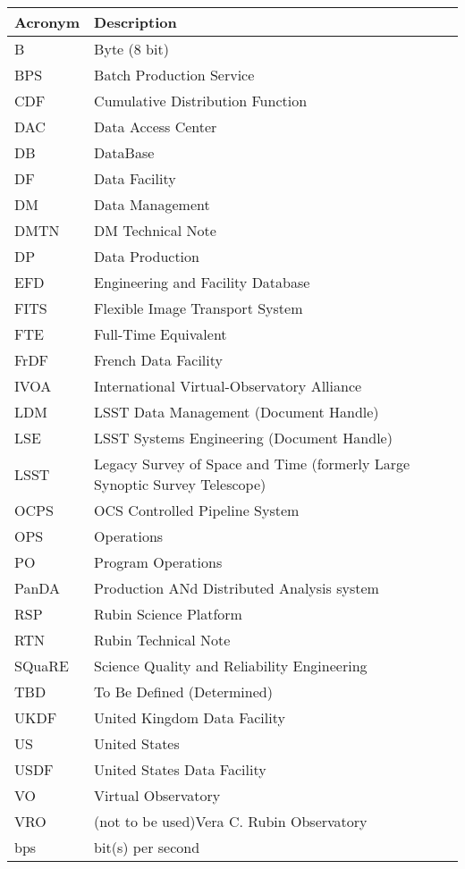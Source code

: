 \addtocounter{table}{-1}
\begin{longtable}{p{}p{}}\hline
\textbf{Acronym} & \textbf{Description}  \\\hline

B & Byte (8 bit) \\\hline
BPS & Batch Production Service \\\hline
CDF & Cumulative Distribution Function \\\hline
DAC & Data Access Center \\\hline
DB & DataBase \\\hline
DF & Data Facility \\\hline
DM & Data Management \\\hline
DMTN & DM Technical Note \\\hline
DP & Data Production \\\hline
EFD & Engineering and Facility Database \\\hline
FITS & Flexible Image Transport System \\\hline
FTE & Full-Time Equivalent \\\hline
FrDF & French Data Facility \\\hline
IVOA & International Virtual-Observatory Alliance \\\hline
LDM & LSST Data Management (Document Handle) \\\hline
LSE & LSST Systems Engineering (Document Handle) \\\hline
LSST & Legacy Survey of Space and Time (formerly Large Synoptic Survey Telescope) \\\hline
OCPS & OCS Controlled Pipeline System \\\hline
OPS & Operations \\\hline
PO & Program Operations \\\hline
PanDA &  Production ANd Distributed Analysis system \\\hline
RSP & Rubin Science Platform \\\hline
RTN & Rubin Technical Note \\\hline
SQuaRE & Science Quality and Reliability Engineering \\\hline
TBD & To Be Defined (Determined) \\\hline
UKDF & United Kingdom Data Facility \\\hline
US & United States \\\hline
USDF & United States Data Facility \\\hline
VO & Virtual Observatory \\\hline
VRO & (not to be used)Vera C. Rubin Observatory \\\hline
bps & bit(s) per second \\\hline
\end{longtable}
